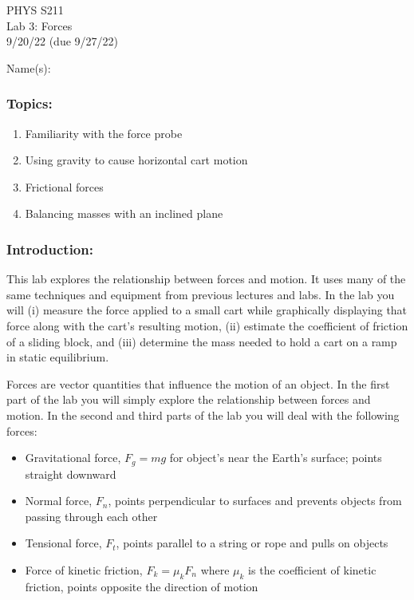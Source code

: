 \documentclass[11pt,letterpaper]{article}
\begin{document}
\setlength{\parindent}{0in}
\setlength{\itemsep}{0in}

\begin{flushright}
PHYS S211\\
Lab 3: Forces\\
9/20/22 (due 9/27/22)
\end{flushright}

Name(s):\\

\subsubsection*{Topics:}
\begin{enumerate}
\setlength{\parskip}{3pt}
\item Familiarity with the force probe
\item Using gravity to cause horizontal cart motion
\item Frictional forces
\item Balancing masses with an inclined plane
\end{enumerate}

\subsubsection*{Introduction:}
This lab explores the relationship between forces and motion. It uses many of the same techniques and equipment from previous lectures and labs. In the lab you will (i) measure the force applied to a small cart while graphically displaying that force along with the cart's resulting motion, (ii) estimate the coefficient of friction of a sliding block, and (iii) determine the mass needed to hold a cart on a ramp in static equilibrium.

Forces are vector quantities that influence the motion of an object. In the first part of the lab you will simply explore the relationship between forces and motion. In the second and third parts of the lab you will deal with the following forces:
\begin{itemize}
\setlength{\parskip}{3pt}
\item Gravitational force, $F_g = mg$ for object's near the Earth's surface; points straight downward
\item Normal force, $F_n$, points perpendicular to surfaces and prevents objects from passing through each other
\item Tensional force, $F_t$, points parallel to a string or rope and pulls on objects
\item Force of kinetic friction, $F_k=\mu_kF_n$ where $\mu_k$ is the coefficient of kinetic friction, points opposite the direction of motion
\end{itemize}
\end{document}
